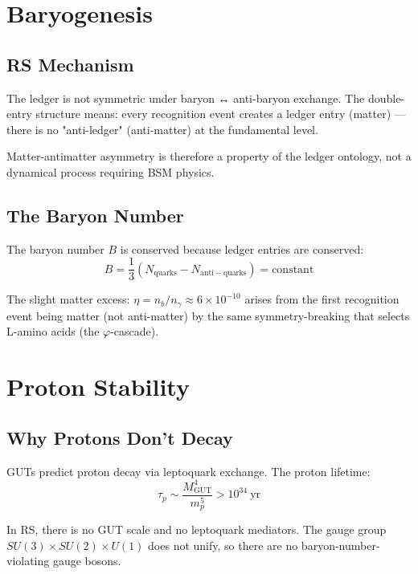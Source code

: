 \documentclass[12pt,a4paper]{article}
\theoremstyle{definition}
\theoremstyle{remark}
\begin{document}
\section{Baryogenesis}

\subsection{RS Mechanism}

The ledger is not symmetric under baryon ↔ anti-baryon exchange. The double-entry 
structure means: every recognition event creates a ledger entry (matter) — there is 
no "anti-ledger" (anti-matter) at the fundamental level.

Matter-antimatter asymmetry is therefore a property of the ledger ontology, not 
a dynamical process requiring BSM physics.

\subsection{The Baryon Number}

The baryon number $B$ is conserved because ledger entries are conserved:
\begin{equation}
B = \frac{1}{3}(N_\mathrm{quarks} - N_\mathrm{anti-quarks}) = \text{constant}
\end{equation}

The slight matter excess: $\eta = n_b/n_\gamma \approx 6 \times 10^{-10}$ 
arises from the first recognition event being matter (not anti-matter) by the 
same symmetry-breaking that selects L-amino acids (the $\varphi$-cascade).

\section{Proton Stability}

\subsection{Why Protons Don't Decay}

GUTs predict proton decay via leptoquark exchange. The proton lifetime:
\begin{equation}
\tau_p \sim \frac{M_\mathrm{GUT}^4}{m_p^5} > 10^{34}~\mathrm{yr}
\end{equation}

In RS, there is no GUT scale and no leptoquark mediators. The gauge group 
$SU(3) \times SU(2) \times U(1)$ does not unify, so there are no baryon-number-violating 
gauge bosons.
\end{document}
